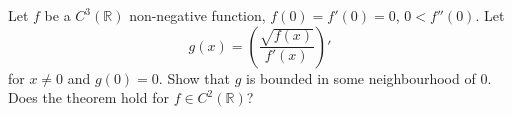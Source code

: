 \documentclass{article}
\begin{document}
\setlength{\parindent}{0pt}
Let $f$ be a $C^3(\mathbb{R})$ non-negative function, $f(0)=f'(0)=0$, $0<f''(0)$.
Let
\[
g(x)=\left(\frac{\sqrt{f(x)}}{f'(x)}\right)'
\]
for $x\neq 0$ and $g(0)=0$.
Show that $g$ is bounded in some neighbourhood of $0$.
Does the theorem hold for $f\in C^2(\mathbb{R})$?
\end{document}
